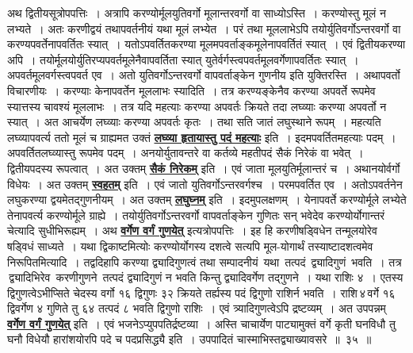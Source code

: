 \documentclass[11pt, openany]{book}
\begin{document}
{{\vspace{-4mm}
 अथ द्वितीयसूत्रोपपत्तिः~। अत्रापि करण्योर्मूलयुतिवर्गो मूलान्तरवर्गो
वा साध्योऽस्ति~। करण्योस्तु मूलं न लभ्यते~। अतः करणीद्वयं तथापवर्तनीयं यथा मूलं लभ्येत~। परं तथा मूललाभेऽपि तयोर्युतिवर्गोऽन्तरवर्गो वा करण्यपवर्तेनापवर्तितः
स्यात्~। यतोऽपवर्तितकरण्या मूलमपवर्ताङ्कमूलेनापवर्तितं स्यात्~। एवं
द्वितीयकरण्या अपि~। तयोर्मूलयोर्युतिरप्यपवर्तमूलेनैवापवर्तिता स्यात्
युतेर्वर्गस्त्वपवर्तमूलवर्गेणापवर्तितः स्यात्~। अपवर्तमूलवर्गस्त्वपवर्त एव~। अतो युतिवर्गोऽन्तरवर्गो वापवर्ताङ्केन गुणनीय इति 
युक्तिरस्ति~। अथापवर्तो विचारणीयः~। करण्याः केनापवर्तेन मूललाभः
स्यादिति~। तत्र करण्यङ्केनैव करण्या अपवर्ते रूपमेव स्यात्तस्य चावश्यं मूललाभः~।
तत्र यदि महत्याः करण्या अपवर्तः क्रियते तदा लघ्व्याः करण्या अपवर्तो न स्यात्~। अत आचर्येण लघ्व्याः करण्या अपवर्तः कृतः~। तथा सति जातं लघुस्थाने रूपम्~। 
महत्यति लघ्व्यापवर्त्य ततो मूलं च ग्राह्यमत उक्तं \hyperref[34]{\textbf{लघ्व्या हृतायास्तु पदं महत्याः}} इति~। इदमपवर्तितमहत्याः पदम्~। अपवर्तितलघ्व्यास्तु रूपमेव पदम्~। अनयोर्युतावन्तरे वा कर्तव्ये महतीपदं सैकं निरेकं वा भवेत्~।
द्वितीयपदस्य रूपत्वात्~। अत उक्तम् \hyperref[34]{\textbf{सैकं निरेकम्}} इति~। एवं जाता मूलयुतिर्मूलान्तरं च~। अथानयोर्वर्गो विधेयः~। अत उक्तम् \hyperref[34]{\textbf{स्वहतम्}} इति~। एवं जातो युतिवर्गोऽन्तरवर्गश्च~। परमपवर्तित एव~। अतोऽपवर्तनेन लघुकरण्या द्वयमेतद्गुणनीयम्~। अत
\newpage
\noindent उक्तम् \hyperref[34]{\textbf{लघुघ्नम्}} इति~। इदमुपलक्षणम्~। येनापवर्ते करण्योर्मूले लभ्येते
तेनापवर्त्य करण्योर्मूले ग्राह्ये~। तयोर्युतिवर्गोऽन्तरवर्गो वापवर्ताङ्केन
गुणितः सन् भवेदेव करण्योर्योगान्तरं चेत्यादि सुधीभिरूह्यम्~। अथ \hyperref[34]{\textbf{वर्गेण वर्गं गुणयेत्}} इत्यत्रोपपत्तिः~। 
इह हि करणीषड्विधेन तन्मूलयोरेव षड्विधं साध्यते~। यथा
द्विकाष्टमित्योः करण्योर्योगस्य दशत्वे सत्यपि मूल-योगार्थं तस्याष्टादशत्वमेव
निरूपितमित्यादि~। 
तद्वदिहापि करण्या द्व्यादिगुणत्वं तथा सम्पादनीयं \,यथा \,तत्पदं \,द्व्यादिगुणं \,भवति~। 
तत्र \,द्व्यादिभिरेव \,करणीगुणने \,तत्पदं द्व्यादिगुणं न भवति किन्तु 
द्व्यादिवर्गेण तद्गुणने~। यथा राशिः ४~। एतस्य द्विगुणत्वेऽभीप्सिते
चेदस्य वर्गो १६ द्विगुणः ३२ क्रियते तर्ह्यस्य पदं द्विगुणो राशिर्न भवति~। राशि\textendash \,४\textendash \,वर्गे १६ द्विवर्गेण ४ गुणिते तु ६४ तत्पदं ८ भवति द्विगुणो राशिः~। एवं 
त्र्यादिगुणत्वेऽपि द्रष्टव्यम्~। अत उपपन्नम् \hyperref[34]{\textbf{वर्गेण वर्गं गुणयेत्}} इति~। एवं  भजनेऽप्युपपतिर्द्रष्टव्या~। अस्ति चाचार्येण पाट्यामुक्तं {\qt वर्गे कृती घनविधौ तु घनौ विधेयौ हारांशयोरपि पदे च पदप्रसिद्ध्यै} इति~। उपपादितं चास्माभिस्तद्व्याख्यावसरे~॥~३५~॥\\

}}
\end{document}
